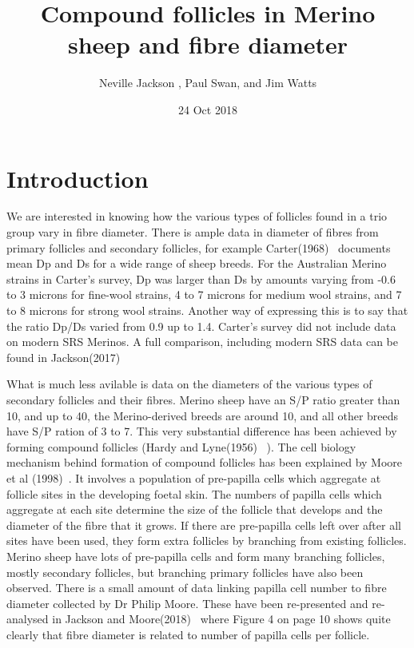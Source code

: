 \documentclass[titlepage]{article}  %
\title{ Compound follicles in Merino sheep and fibre diameter}
\author{Neville Jackson , Paul Swan, and Jim Watts}
\date{24 Oct 2018}
\begin{document}
 
 
\maketitle      
\tableofcontents


\clearpage
\section{Introduction} 
We are interested in knowing how the various types of follicles found in a trio group vary in fibre diameter. There is ample data in diameter of fibres from primary follicles and secondary follicles, for example Carter(1968)~\cite{cart:68} documents mean Dp and Ds for a wide range of sheep breeds. For the Australian Merino strains in Carter's survey, Dp was larger than Ds by amounts varying from -0.6 to 3 microns for fine-wool strains, 4 to 7 microns for medium wool strains, and 7 to 8 microns for strong wool strains. Another way of expressing this is to say that the ratio Dp/Ds varied from 0.9 up to 1.4. Carter's survey did not include data on modern SRS Merinos. A full comparison, including modern SRS data can be found in Jackson(2017)~\cite{jack:17b}

What is much less avilable is data on the diameters of the various types of secondary follicles and their fibres.  Merino sheep have an S/P ratio greater than 10, and up to 40, the Merino-derived breeds are around 10, and all other breeds have S/P ration of 3 to 7. This very substantial difference has been achieved by forming compound follicles (Hardy and Lyne(1956)~\cite{hard:56} ). The cell biology mechanism behind formation of compound follicles has been explained by Moore et al (1998)~\cite{moor:98}. It involves a population of pre-papilla cells which aggregate at follicle sites in the developing foetal skin. The numbers of papilla cells which aggregate at each site determine the size of the follicle that develops and the diameter of the fibre that it grows. If there are pre-papilla cells left over after all sites have been used, they form extra follicles by branching from existing follicles. Merino sheep have lots of pre-papilla cells and form many branching follicles, mostly secondary follicles, but branching primary follicles have also been observed. There is a small amount of data linking papilla cell number to fibre diameter collected by Dr Philip Moore. These have been re-presented and re-analysed in Jackson and Moore(2018)~\cite{jamo:18} where Figure 4 on page 10 shows quite clearly that fibre diameter is related to number of papilla cells per follicle.
\end{document}
